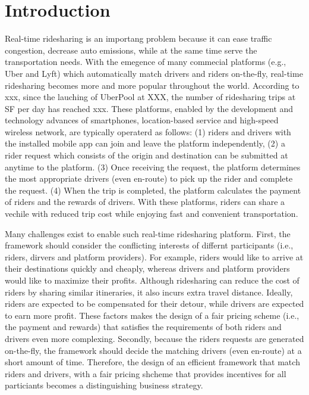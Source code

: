 \section{Introduction}
Real-time ridesharing is an importang problem because it can ease traffic congestion, decrease auto emissions, while at the same time serve the transportation needs. With the emegence of many commecial platforms (e.g., Uber and Lyft) which automatically match drivers and riders on-the-fly, real-time ridesharing becomes more and more popular throughout the world. According to xxx, since the lauching of UberPool at XXX, the number of ridesharing trips at SF per day has reached xxx. These platforms, enabled by the development and technology advances of smartphones, location-based service and high-speed wireless network, are typically operaterd as follows: (1) riders and drivers with the installed mobile app can join and leave the platform independently, (2) a rider request which consists of the origin and destination can be submitted at anytime to the platform. (3) Once receiving the request, the platform determines the most appropriate drivers (even en-route) to pick up the rider and complete the request. (4) When the trip is completed, the platform calculates the payment of riders and the rewards of drivers. With these platforms, riders can share a vechile with reduced trip cost while  enjoying fast and convenient transportation.

Many challenges exist to enable such real-time ridesharing platform. First, the framework should consider the conflicting interests of differnt participants (i.e., riders, dirvers and platform providers). For example, riders would like to arrive at their destinations quickly and cheaply, whereas drivers and platform providers would like to maximize their profits. Although ridesharing can reduce the cost of riders by sharing similar itineraries, it also incurs extra travel distance. Ideally, riders are expected to be compensated for their detour, while drivers are expected to earn more profit. These factors makes the design of a fair pricing scheme (i.e., the payment and rewards) that satisfies the requirements of both riders and drivers even more complexing. Secondly, because the riders requests are generated on-the-fly, the framework should decide the matching drivers (even en-route) at a short amount of time. Therefore, the design of an efficient framework that match riders and drivers, with a fair pricing shcheme that provides incentives for all particiants becomes a distinguishing business strategy. 

